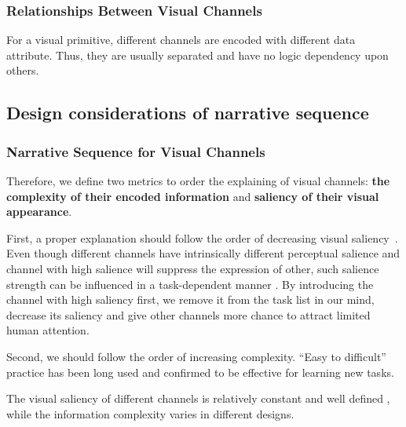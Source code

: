 \subsubsection{Relationships Between Visual Channels}
For a visual primitive, different channels are encoded with different data attribute. Thus, they are usually separated and have no logic dependency upon others. 

\subsection{Design considerations of narrative sequence}


\subsubsection{Narrative Sequence for Visual Channels}


Therefore, we define two metrics to order the explaining of visual channels: \textbf{the complexity of their encoded information} and \textbf{saliency of their visual appearance}.

First, a proper explanation should follow the order of decreasing visual saliency~\cite{cleveland_graphical_1984}. Even though different channels have intrinsically different perceptual salience and channel with high salience will suppress the expression of other, such salience strength can be influenced in a task-dependent manner \cite{nothdurft_salience_2000}. By introducing the channel with high saliency first, we remove it from the task list in our mind\cite{itti2001computational}, decrease its saliency and give other channels more chance to attract limited human attention. 

Second, we should follow the order of increasing complexity. “Easy to difficult” practice has been long used and confirmed to be effective for learning new tasks\cite{bliss_effects_1992}.

 
The visual saliency of different channels is relatively constant and  well defined \cite{munzner_visualization_2014,cleveland_graphical_1984}, while the information complexity varies in different designs. 

